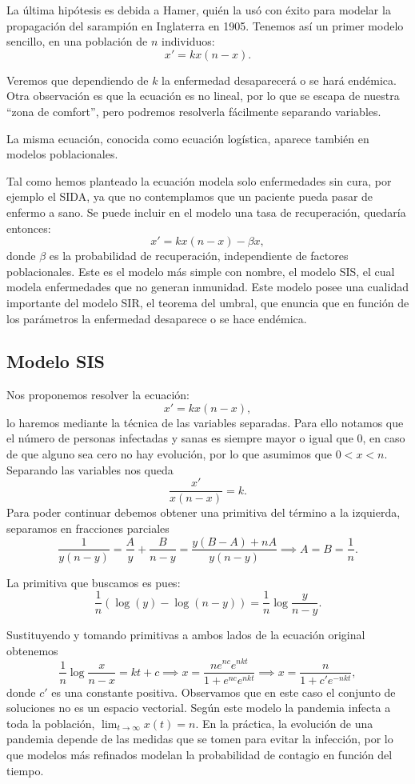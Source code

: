 \documentclass[../ecuaciones_diferenciales.tex]{subfiles}
\begin{document}
La última hipótesis es debida a Hamer, quién la usó con éxito para modelar
la propagación del sarampión en Inglaterra en 1905. Tenemos así un primer
modelo sencillo, en una población de \(n\) individuos:
\[x' = k x(n - x).\]

Veremos que dependiendo de \(k\) la enfermedad desaparecerá o se hará endémica.
Otra observación es que la ecuación es no lineal, por lo que se escapa de
nuestra ``zona de comfort'', pero podremos resolverla fácilmente separando
variables.

\begin{remark}
	La misma ecuación, conocida como ecuación logística, aparece también en
	modelos poblacionales.
\end{remark}

Tal como hemos planteado la ecuación modela solo enfermedades sin cura, por
ejemplo el SIDA, ya que no contemplamos que un paciente pueda pasar de enfermo a
sano. Se puede incluir en el modelo una tasa de recuperación, quedaría entonces:
\[x' = k x(n - x) - \beta x,\]
donde \(\beta\) es la probabilidad de recuperación, independiente de factores
poblacionales. Este es el modelo más simple con nombre, el modelo SIS, el cual
modela enfermedades que no generan inmunidad. Este modelo posee una cualidad
importante del modelo SIR, el teorema del umbral, que enuncia que en función de
los parámetros la enfermedad desaparece o se hace endémica.

\subsection{Modelo SIS}

Nos proponemos resolver la ecuación:
\[x' = k x(n - x),\]
lo haremos mediante la técnica de las variables separadas. Para ello notamos que
el número de personas infectadas y sanas es siempre mayor o igual que 0, en caso
de que alguno sea cero no hay evolución, por lo que asumimos que \(0 < x < n\).
Separando las variables nos queda
\[\frac{x'}{x(n - x)} = k.\]
Para poder continuar debemos obtener una primitiva del término a la izquierda,
separamos en fracciones parciales
\[\frac{1}{y(n - y)} = \frac{A}{y} + \frac{B}{n - y}
	= \frac{y(B - A) + nA}{y(n - y)} \implies A = B = \frac{1}{n}.\]

La primitiva que buscamos es pues:
\[\frac{1}{n} (\log(y) - \log(n - y)) = \frac{1}{n} \log \frac{y}{n - y}.\]

Sustituyendo y tomando primitivas a ambos lados de la ecuación original obtenemos
\[\frac{1}{n} \log\frac{x}{n - x} = kt + c
	\implies x = \frac{n e^{nc} e^{nkt}}{1 + e^{nc} e^{nkt}}
	\implies x = \frac{n}{1 + c' e^{-nkt}},\]
donde \(c'\) es una constante positiva. Observamos que en este caso el
conjunto de soluciones no es un espacio vectorial. Según este modelo la
pandemia infecta a toda la población, \(\lim_{t \to \infty} x(t) = n\). En la
práctica, la evolución de una pandemia depende de las medidas que se tomen
para evitar la infección, por lo que modelos más refinados modelan la
probabilidad de contagio en función del tiempo.
\end{document}
